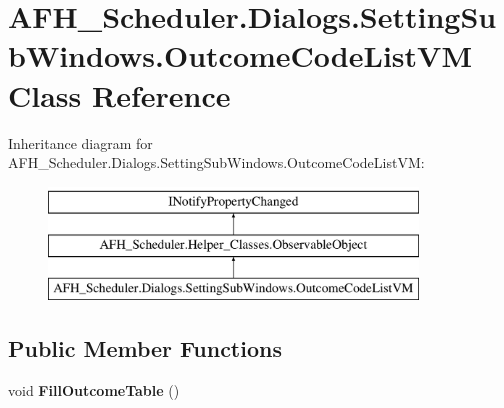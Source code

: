 \section{A\+F\+H\+\_\+\+Scheduler.\+Dialogs.\+Setting\+Sub\+Windows.\+Outcome\+Code\+List\+VM Class Reference}
\label{class_a_f_h___scheduler_1_1_dialogs_1_1_setting_sub_windows_1_1_outcome_code_list_v_m}
Inheritance diagram for A\+F\+H\+\_\+\+Scheduler.\+Dialogs.\+Setting\+Sub\+Windows.\+Outcome\+Code\+List\+VM\+:\begin{figure}[H]
\begin{center}
\leavevmode
\includegraphics[height=3.000000cm]{class_a_f_h___scheduler_1_1_dialogs_1_1_setting_sub_windows_1_1_outcome_code_list_v_m}
\end{center}
\end{figure}
\subsection*{Public Member Functions}
\begin{DoxyCompactItemize}
\item 
\mbox{\label{class_a_f_h___scheduler_1_1_dialogs_1_1_setting_sub_windows_1_1_outcome_code_list_v_m_af74551e401a8bda1aea4b9f28b679933}} 
void {\bfseries Fill\+Outcome\+Table} ()
\end{DoxyCompactItemize}

